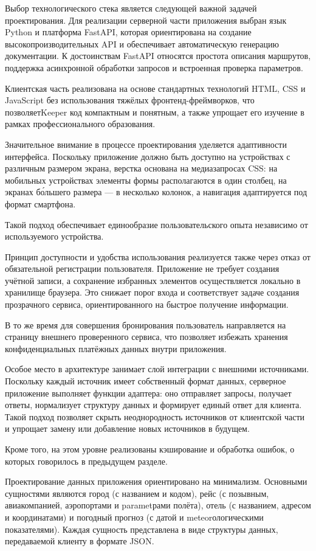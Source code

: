 \documentclass[14pt,a4paper,oneside]{extreport}
\begin{document}
Выбор технологического стека является следующей важной задачей проектирования. Для реализации серверной части приложения выбран язык Python и платформа FastAPI, которая ориентирована на создание высокопроизводительных API и обеспечивает автоматическую генерацию документации. К достоинствам FastAPI относятся простота описания маршрутов, поддержка асинхронной обработки запросов и встроенная проверка параметров.

Клиентская часть реализована на основе стандартных технологий HTML, CSS и JavaScript без использования тяжёлых фронтенд-фреймворков, что позволяетKeeper код компактным и понятным, а также упрощает его изучение в рамках профессионального образования.

Значительное внимание в процессе проектирования уделяется адаптивности интерфейса. Поскольку приложение должно быть доступно на устройствах с различным размером экрана, верстка основана на медиазапросах CSS: на мобильных устройствах элементы формы располагаются в один столбец, на экранах бо́льшего размера — в несколько колонок, а навигация адаптируется под формат смартфона.

Такой подход обеспечивает единообразие пользовательского опыта независимо от используемого устройства.

Принцип доступности и удобства использования реализуется также через отказ от обязательной регистрации пользователя. Приложение не требует создания учётной записи, а сохранение избранных элементов осуществляется локально в хранилище браузера. Это снижает порог входа и соответствует задаче создания прозрачного сервиса, ориентированного на быстрое получение информации.

В то же время для совершения бронирования пользователь направляется на страницу внешнего проверенного сервиса, что позволяет избежать хранения конфиденциальных платёжных данных внутри приложения.

Особое место в архитектуре занимает слой интеграции с внешними источниками. Поскольку каждый источник имеет собственный формат данных, серверное приложение выполняет функции адаптера: оно отправляет запросы, получает ответы, нормализует структуру данных и формирует единый ответ для клиента. Такой подход позволяет скрыть неоднородность источников от клиентской части и упрощает замену или добавление новых источников в будущем.

Кроме того, на этом уровне реализованы кэширование и обработка ошибок, о которых говорилось в предыдущем разделе.

Проектирование данных приложения ориентировано на минимализм. Основными сущностями являются город (с названием и кодом), рейс (с позывным, авиакомпанией, аэропортами и parametрами полёта), отель (с названием, адресом и координатами) и погодный прогноз (с датой и meteorологическими показателями). Каждая сущность представлена в виде структуры данных, передаваемой клиенту в формате JSON.
\end{document}
